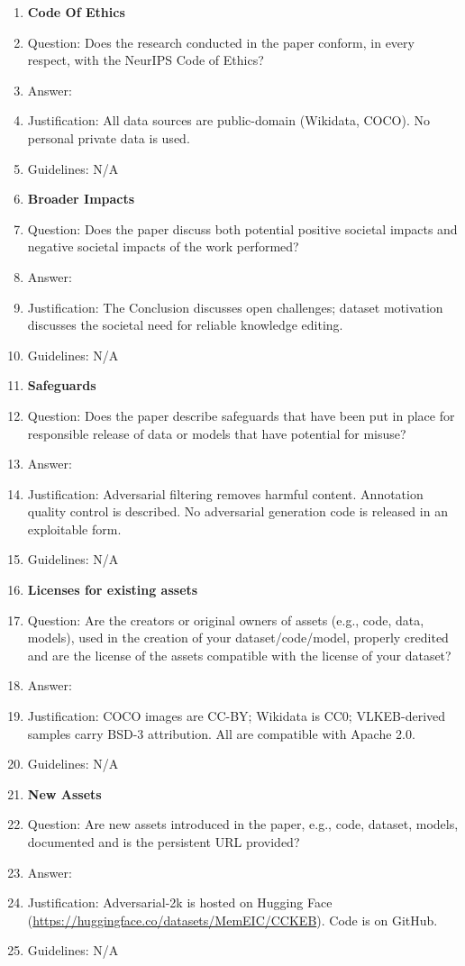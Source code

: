 \begin{enumerate}
\item {\bf Code Of Ethics}
\item[] Question: Does the research conducted in the paper conform, in every respect, with the NeurIPS Code of Ethics?
\item[] Answer: \answerYes{}
\item[] Justification: All data sources are public-domain (Wikidata, COCO). No personal private data is used.
\item[] Guidelines: N/A

\item {\bf Broader Impacts}
\item[] Question: Does the paper discuss both potential positive societal impacts and negative societal impacts of the work performed?
\item[] Answer: \answerYes{}
\item[] Justification: The Conclusion discusses open challenges; dataset motivation discusses the societal need for reliable knowledge editing.
\item[] Guidelines: N/A

\item {\bf Safeguards}
\item[] Question: Does the paper describe safeguards that have been put in place for responsible release of data or models that have potential for misuse?
\item[] Answer: \answerYes{}
\item[] Justification: Adversarial filtering removes harmful content. Annotation quality control is described. No adversarial generation code is released in an exploitable form.
\item[] Guidelines: N/A

\item {\bf Licenses for existing assets}
\item[] Question: Are the creators or original owners of assets (e.g., code, data, models), used in the creation of your dataset/code/model, properly credited and are the license of the assets compatible with the license of your dataset?
\item[] Answer: \answerYes{}
\item[] Justification: COCO images are CC-BY; Wikidata is CC0; VLKEB-derived samples carry BSD-3 attribution. All are compatible with Apache 2.0.
\item[] Guidelines: N/A

\item {\bf New Assets}
\item[] Question: Are new assets introduced in the paper, e.g., code, dataset, models, documented and is the persistent URL provided?
\item[] Answer: \answerYes{}
\item[] Justification: Adversarial-2k is hosted on Hugging Face (\url{https://huggingface.co/datasets/MemEIC/CCKEB}). Code is on GitHub.
\item[] Guidelines: N/A


\end{enumerate}
